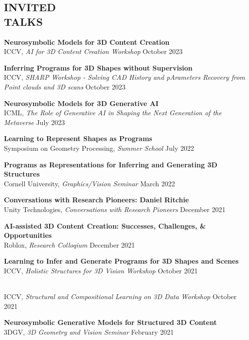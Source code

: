 \documentclass[line,margin]{res}
\begin{document}
\begin{resume}

\section{INVITED\\TALKS}

\newcommand{\talktitle}[1]{
	\textbf{#1}
}
\newcommand{\talk}[3]{
	#1, \emph{#2} \hfill #3
}

\talktitle{Neurosymbolic Models for 3D Content Creation}\\
\talk
	{ICCV}
	{AI for 3D Content Creation Workshop}
	{October 2023}

\talktitle{Inferring Programs for 3D Shapes without Supervision}\\
\talk
	{ICCV}
	{SHARP Workshop - Solving CAD History and pArameters Recovery from Point clouds and 3D scans}
	{October 2023}

\talktitle{Neurosymbolic Models for 3D Generative AI}\\
\talk
	{ICML}
	{The Role of Generative AI in Shaping the Next Generation of the Metaverse}
	{July 2023}

\talktitle{Learning to Represent Shapes as Programs}\\
\talk
	{Symposium on Geometry Processing}
	{Summer School}
	{July 2022}

\talktitle{Programs as Representations for Inferring and Generating 3D Structures}\\
\talk
	{Cornell University}
	{Graphics/Vision Seminar}
	{March 2022}

\talktitle{Conversations with Research Pioneers: Daniel Ritchie}\\
\talk
	{Unity Technologies}
	{Conversations with Research Pioneers}
	{December 2021}

\talktitle{AI-assisted 3D Content Creation: Successes, Challenges, \& Opportunities}\\
\talk
	{Roblox}
	{Research Colloqium}
	{December 2021}

\talktitle{Learning to Infer and Generate Programs for 3D Shapes and Scenes}\\
\talk
	{ICCV}
	{Holistic Structures for 3D Vision Workshop}
	{October 2021}
\\
\talk
	{ICCV}
	{Structural and Compositional Learning on 3D Data Workshop}
	{October 2021}

\talktitle{Neurosymbolic Generative Models for Structured 3D Content}\\
\talk
	{3DGV}
	{3D Geometry and Vision Seminar}
	{February 2021}


\end{resume}
\end{document}
